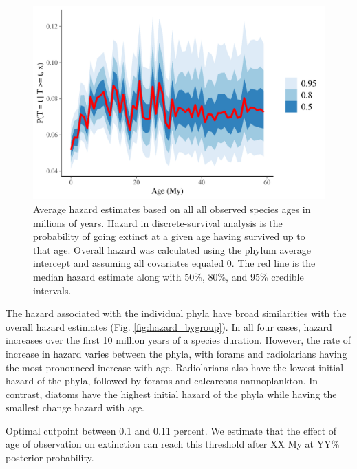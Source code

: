 \documentclass[12pt,letterpaper]{article}
\begin{document}
\begin{figure}[ht]
  \centering
  \includegraphics[width=\textwidth,height=0.5\textheight,keepaspectratio=true]{../results/figure/hazard_baseline}
  \caption{Average hazard estimates based on all all observed species ages in millions of years. Hazard in discrete-survival analysis is the probability of going extinct at a given age having survived up to that age. Overall hazard was calculated using the phylum average intercept and assuming all covariates equaled 0. The red line is the median hazard estimate along with 50\%, 80\%, and 95\% credible intervals.}
  \label{fig:hazard_baseline}
\end{figure}

The hazard associated with the individual phyla have broad similarities with the overall hazard estimates (Fig. \ref{fig:hazard_bygroup}). In all four cases, hazard increases over the first 10 million years of a species duration. However, the rate of increase in hazard varies between the phyla, with forams and radiolarians having the most pronounced increase with age. Radiolarians also have the lowest initial hazard of the phyla, followed by forams and calcareous nannoplankton. In contrast, diatoms have the highest initial hazard of the phyla while having the smallest change hazard with age. 

Optimal cutpoint between 0.1 and 0.11 percent. We estimate that the effect of age of observation on extinction can reach this threshold after XX My at YY\% posterior probability.
\end{document}
